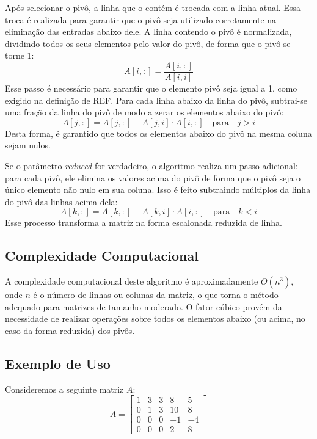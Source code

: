 Após selecionar o pivô, a linha que o contém é trocada com a linha atual. Essa troca é realizada para garantir que o pivô seja utilizado corretamente na eliminação das entradas abaixo dele. A linha contendo o pivô é normalizada, dividindo todos os seus elementos pelo valor do pivô, de forma que o pivô se torne 1:
\begin{equation}
    A[i,:] = \frac{A[i,:]}{A[i,i]}
\end{equation}
Esse passo é necessário para garantir que o elemento pivô seja igual a 1, como exigido na definição de REF. Para cada linha abaixo da linha do pivô, subtrai-se uma fração da linha do pivô de modo a zerar os elementos abaixo do pivô:
\begin{equation}
    A[j,:] = A[j,:] - A[j,i] \cdot A[i,:] \quad \text{para} \quad j > i
\end{equation}
Desta forma, é garantido que todos os elementos abaixo do pivô na mesma coluna sejam nulos.

Se o parâmetro \textit{reduced} for verdadeiro, o algoritmo realiza um passo adicional: para cada pivô, ele elimina os valores acima do pivô de forma que o pivô seja o único elemento não nulo em sua coluna. Isso é feito subtraindo múltiplos da linha do pivô das linhas acima dela:
\begin{equation}
    A[k,:] = A[k,:] - A[k,i] \cdot A[i,:] \quad \text{para} \quad k < i
\end{equation}
Esse processo transforma a matriz na forma escalonada reduzida de linha.

\subsection{Complexidade Computacional}
A complexidade computacional deste algoritmo é aproximadamente \( O(n^3) \), onde \( n \) é o número de linhas ou colunas da matriz, o que torna o método adequado para matrizes de tamanho moderado. O fator cúbico provém da necessidade de realizar operações sobre todos os elementos abaixo (ou acima, no caso da forma reduzida) dos pivôs.

\subsection{Exemplo de Uso}

Consideremos a seguinte matriz \( A \):
\begin{equation}
  A = \begin{bmatrix}
  1 & 3 & 3 & 8 & 5 \\
  0 & 1 & 3 & 10 & 8 \\
  0 & 0 & 0 & -1 & -4 \\
  0 & 0 & 0 & 2 & 8
  \end{bmatrix}
\end{equation}

